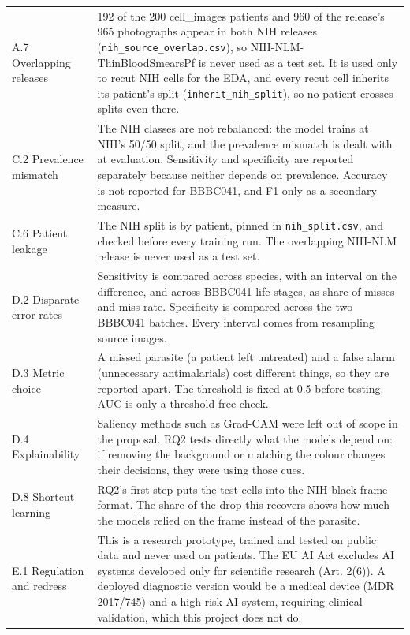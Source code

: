 \documentclass[11pt,a4paper]{article}
\begin{document}
{\begin{longtable}{@{}>{\raggedright\arraybackslash\hspace{0pt}}p{79.7pt}>{\raggedright\arraybackslash\hspace{0pt}}p{256.3pt}@{}}
A.7 Overlapping releases & 192 of the 200 cell\_\allowbreak{}images patients and 960 of the release's 965 photographs appear in both NIH releases (\texttt{nih\_\allowbreak{}source\_\allowbreak{}overlap.\allowbreak{}csv}), so NIH-NLM-ThinBloodSmearsPf is never used as a test set. It is used only to recut NIH cells for the EDA, and every recut cell inherits its patient's split (\texttt{inherit\_\allowbreak{}nih\_\allowbreak{}split}), so no patient crosses splits even there. \\
C.2 Prevalence mismatch & The NIH classes are not rebalanced: the model trains at NIH's 50/50 split, and the prevalence mismatch is dealt with at evaluation. Sensitivity and specificity are reported separately because neither depends on prevalence. Accuracy is not reported for BBBC041, and F1 only as a secondary measure. \\
C.6 Patient leakage & The NIH split is by patient, pinned in \texttt{nih\_\allowbreak{}split.\allowbreak{}csv}, and checked before every training run. The overlapping NIH-NLM release is never used as a test set. \\
D.2 Disparate error rates & Sensitivity is compared across species, with an interval on the difference, and across BBBC041 life stages, as share of misses and miss rate. Specificity is compared across the two BBBC041 batches. Every interval comes from resampling source images. \\
D.3 Metric choice & A missed parasite (a patient left untreated) and a false alarm (unnecessary antimalarials) cost different things, so they are reported apart. The threshold is fixed at 0.5 before testing. AUC is only a threshold-free check. \\
D.4 Explainability & Saliency methods such as Grad-CAM were left out of scope in the proposal. RQ2 tests directly what the models depend on: if removing the background or matching the colour changes their decisions, they were using those cues. \\
D.8 Shortcut learning & RQ2's first step puts the test cells into the NIH black-frame format. The share of the drop this recovers shows how much the models relied on the frame instead of the parasite. \\
E.1 Regulation and redress & This is a research prototype, trained and tested on public data and never used on patients. The EU AI Act excludes AI systems developed only for scientific research (Art. 2(6)). A deployed diagnostic version would be a medical device (MDR 2017/745) and a high-risk AI system, requiring clinical validation, which this project does not do. \\

\end{longtable}}
\end{document}
